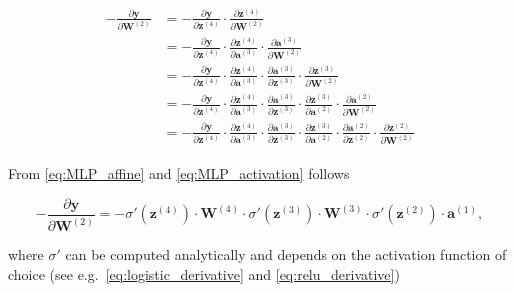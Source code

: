 \begin{align}\label{eq:backprop_step2}
\begin{split}
    -\frac{\partial\mathbf{y}}{\partial \mathbf{W}^{(2)}} &=
        -\frac{\partial \mathbf{y}}     {\partial \mathbf{z}^{(4)}} \cdot
        \frac{\partial \mathbf{z}^{(4)}}{\partial \mathbf{W}^{(2)}} \\
    &= -\frac{\partial \mathbf{y}}      {\partial \mathbf{z}^{(4)}} \cdot
        \frac{\partial \mathbf{z}^{(4)}}{\partial \mathbf{a}^{(3)}} \cdot
        \frac{\partial \mathbf{a}^{(3)}}{\partial \mathbf{W}^{(2)}} \\
    &= -\frac{\partial \mathbf{y}}      {\partial \mathbf{z}^{(4)}} \cdot
        \frac{\partial \mathbf{z}^{(4)}}{\partial \mathbf{a}^{(3)}} \cdot
        \frac{\partial \mathbf{a}^{(3)}}{\partial \mathbf{z}^{(3)}} \cdot
        \frac{\partial \mathbf{z}^{(3)}}{\partial \mathbf{W}^{(2)}} \\
    &= -\frac{\partial \mathbf{y}}      {\partial \mathbf{z}^{(4)}} \cdot
        \frac{\partial \mathbf{z}^{(4)}}{\partial \mathbf{a}^{(3)}} \cdot
        \frac{\partial \mathbf{a}^{(3)}}{\partial \mathbf{z}^{(3)}} \cdot
        \frac{\partial \mathbf{z}^{(3)}}{\partial \mathbf{a}^{(2)}} \cdot
        \frac{\partial \mathbf{a}^{(2)}}{\partial \mathbf{W}^{(2)}} \\
    &= -\frac{\partial \mathbf{y}}      {\partial \mathbf{z}^{(4)}} \cdot
        \frac{\partial \mathbf{z}^{(4)}}{\partial \mathbf{a}^{(3)}} \cdot
        \frac{\partial \mathbf{a}^{(3)}}{\partial \mathbf{z}^{(3)}} \cdot
        \frac{\partial \mathbf{z}^{(3)}}{\partial \mathbf{a}^{(2)}} \cdot
        \frac{\partial \mathbf{a}^{(2)}}{\partial \mathbf{z}^{(2)}} \cdot
        \frac{\partial \mathbf{z}^{(2)}}{\partial \mathbf{W}^{(2)}}
\end{split}
\end{align}

\noindent From \autoref{eq:MLP_affine} and \autoref{eq:MLP_activation} follows

\begin{equation}\label{eq:backprop_step3}
    -\frac{\partial\mathbf{y}}{\partial \mathbf{W}^{(2)}} =
    -\sigma'(\mathbf{z}^{(4)}) \cdot
        \mathbf{W}^{(4)} \cdot
        \sigma'(\mathbf{z}^{(3)}) \cdot
        \mathbf{W}^{(3)} \cdot
        \sigma'(\mathbf{z}^{(2)}) \cdot
        \mathbf{a}^{(1)},
\end{equation}

\noindent where $\sigma'$ can be computed analytically and depends on the
activation function of choice (see e.g.~\autoref{eq:logistic_derivative} and
\autoref{eq:relu_derivative})


